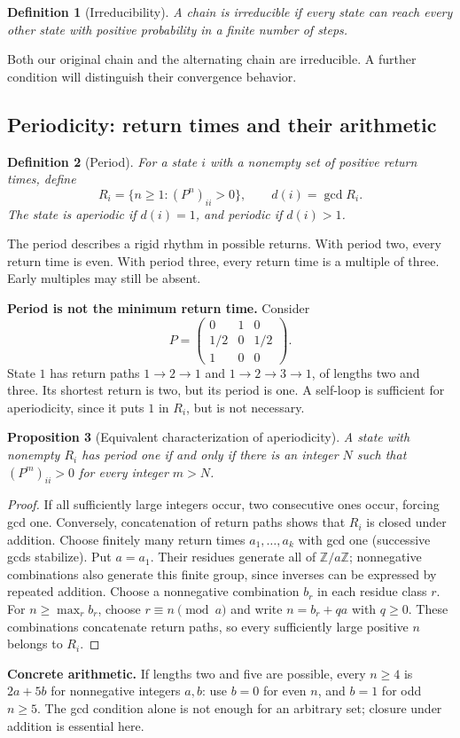 \documentclass[11pt]{article}
\newtheorem{definition}{Definition}[section]
\newtheorem{proposition}[definition]{Proposition}
\theoremstyle{remark}\newtheorem{remark}[definition]{Remark}
\begin{document}
\begin{definition}[Irreducibility]
A chain is irreducible if every state can reach every other state with positive probability in a finite number of steps.
\end{definition}
Both our original chain and the alternating chain are irreducible. A further condition will distinguish their convergence behavior.

\clearpage
\subsection{Periodicity: return times and their arithmetic}
\begin{definition}[Period]
For a state $i$ with a nonempty set of positive return times, define
\[
R_i=\{n\geq1:(P^n)_{ii}>0\},\qquad d(i)=\gcd R_i.
\]
The state is aperiodic if $d(i)=1$, and periodic if $d(i)>1$.
\end{definition}
The period describes a rigid rhythm in possible returns. With period two, every return time is even. With period three, every return time is a multiple of three. Early multiples may still be absent.

\textbf{Period is not the minimum return time.} Consider
\[
P=\begin{pmatrix}0&1&0\\1/2&0&1/2\\1&0&0\end{pmatrix}.
\]
State $1$ has return paths $1\to2\to1$ and $1\to2\to3\to1$, of lengths two and three. Its shortest return is two, but its period is one. A self-loop is sufficient for aperiodicity, since it puts $1$ in $R_i$, but is not necessary.

\begin{proposition}[Equivalent characterization of aperiodicity]
A state with nonempty $R_i$ has period one if and only if there is an integer $N$ such that $(P^m)_{ii}>0$ for every integer $m>N$.
\end{proposition}
\begin{proof}
If all sufficiently large integers occur, two consecutive ones occur, forcing gcd one. Conversely, concatenation of return paths shows that $R_i$ is closed under addition. Choose finitely many return times $a_1,\ldots,a_k$ with gcd one (successive gcds stabilize). Put $a=a_1$. Their residues generate all of $\mathbb Z/a\mathbb Z$; nonnegative combinations also generate this finite group, since inverses can be expressed by repeated addition. Choose a nonnegative combination $b_r$ in each residue class $r$. For $n\geq\max_r b_r$, choose $r\equiv n\pmod a$ and write $n=b_r+qa$ with $q\geq0$. These combinations concatenate return paths, so every sufficiently large positive $n$ belongs to $R_i$.
\end{proof}
\textbf{Concrete arithmetic.} If lengths two and five are possible, every $n\geq4$ is $2a+5b$ for nonnegative integers $a,b$: use $b=0$ for even $n$, and $b=1$ for odd $n\geq5$. The gcd condition alone is not enough for an arbitrary set; closure under addition is essential here.
\end{document}
